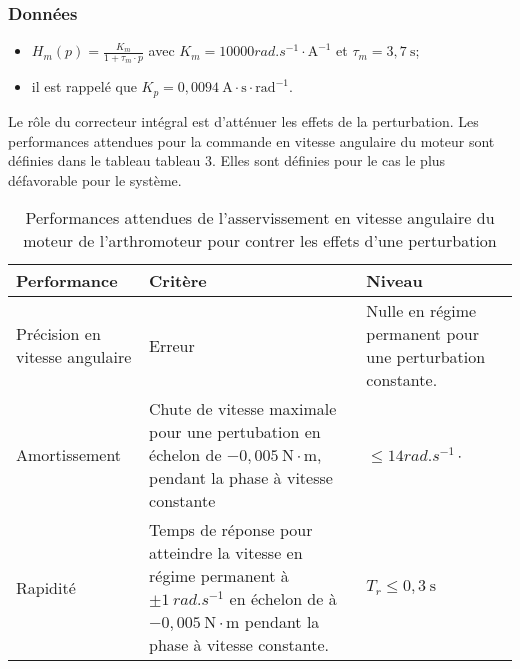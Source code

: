 \subsubsection*{Données}

\begin{itemize}
  \item $H_{m}(p)=\frac{K_{m}}{1+\tau_{m} \cdot p}$ avec $K_{m}=10000 \si{rad.s^{-1}} \cdot \mathrm{A}^{-1}$ et $\tau_{m}=3,7 \mathrm{~s}$;

  \item il est rappelé que $K_{p}=0,0094 \mathrm{~A} \cdot \mathrm{s} \cdot \mathrm{rad}^{-1}$.

\end{itemize}

Le rôle du correcteur intégral est d'atténuer les effets de la perturbation. Les performances attendues pour la commande en vitesse angulaire du moteur sont définies dans le tableau tableau 3. Elles sont définies pour le cas le plus défavorable pour le système.

\begin{table}[!h]
\centering
\begin{tabular}{p{.25\linewidth}p{.5\linewidth}p{.25\linewidth}}
\hline
\textbf{Performance} & \textbf{Critère} & \textbf{Niveau} \\
\hline
Précision en vitesse angulaire & Erreur & Nulle en régime permanent pour une perturbation constante. \\
Amortissement & Chute de vitesse maximale pour une pertubation en échelon de $-0,005 \mathrm{~N} \cdot \mathrm{m}$, pendant la phase à vitesse constante & $\leqslant 14 \si{rad.s^{-1}} \cdot$ \\
Rapidité & Temps de réponse pour atteindre la vitesse en régime permanent à $\pm \SI{1}{rad.s^{-1}}$ en échelon de à $-0,005 \mathrm{~N} \cdot \mathrm{m}$ pendant la phase à vitesse constante. 
& $T_{r} \leqslant 0,3 \mathrm{~s}$ \\
\hline
\end{tabular}
\caption{\label{tab:ccs_mp_2024:03} Performances attendues de l'asservissement en vitesse angulaire du moteur de l'arthromoteur pour contrer les effets d'une perturbation}
\end{table}



